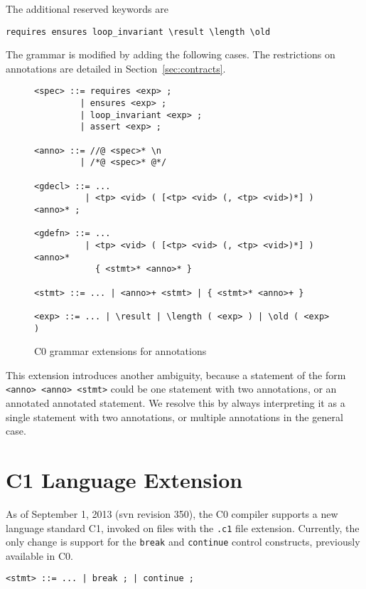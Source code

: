 \documentclass[11pt]{article}
\begin{document}
The additional reserved keywords are
\begin{verbatim}
requires ensures loop_invariant \result \length \old
\end{verbatim}
The grammar is modified by adding the following cases.  The
restrictions on annotations are detailed in
Section~\ref{sec:contracts}.

\begin{figure}
\begin{small}
\begin{verbatim}
<spec> ::= requires <exp> ;
         | ensures <exp> ;
         | loop_invariant <exp> ;
         | assert <exp> ;

<anno> ::= //@ <spec>* \n
         | /*@ <spec>* @*/

<gdecl> ::= ...
          | <tp> <vid> ( [<tp> <vid> (, <tp> <vid>)*] ) <anno>* ;

<gdefn> ::= ...
          | <tp> <vid> ( [<tp> <vid> (, <tp> <vid>)*] ) <anno>*
            { <stmt>* <anno>* }

<stmt> ::= ... | <anno>+ <stmt> | { <stmt>* <anno>+ }

<exp> ::= ... | \result | \length ( <exp> ) | \old ( <exp> )
\end{verbatim}
\end{small}
\caption{C0 grammar extensions for annotations}
\end{figure}

This extension introduces another ambiguity, because a statement of the
form \verb'<anno> <anno> <stmt>' could be one statement with two
annotations, or an annotated annotated statement.  We resolve this by
always interpreting it as a single statement with two annotations, or
multiple annotations in the general case.

\section{C1 Language Extension}
\label{sec:c1}

As of September 1, 2013 (svn revision 350), the C0 compiler supports a
new language standard C1, invoked on files with the \verb'.c1' file
extension.  Currently, the only change is support for the \verb'break'
and \verb'continue' control constructs, previously available in C0.

\begin{small}
\begin{verbatim}
<stmt> ::= ... | break ; | continue ;
\end{verbatim}
\end{small}
\end{document}
